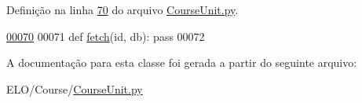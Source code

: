 Definição na linha \hyperlink{CourseUnit_8py_source_l00070}{70} do arquivo \hyperlink{CourseUnit_8py_source}{Course\-Unit.\-py}.


\begin{DoxyCode}
\hypertarget{classCourse_1_1CourseUnit_1_1IfPersCourse_l00070}{}\hyperlink{classCourse_1_1CourseUnit_1_1IfPersCourse_adcd2e66255b773b6a196bafefdc851e8}{00070} 
00071     \textcolor{keyword}{def }\hyperlink{classCourse_1_1CourseUnit_1_1IfPersCourse_adcd2e66255b773b6a196bafefdc851e8}{fetch}(id, db): \textcolor{keyword}{pass}
00072 

\end{DoxyCode}


A documentação para esta classe foi gerada a partir do seguinte arquivo\-:\begin{DoxyCompactItemize}
\item 
E\-L\-O/\-Course/\hyperlink{CourseUnit_8py}{Course\-Unit.\-py}\end{DoxyCompactItemize}
